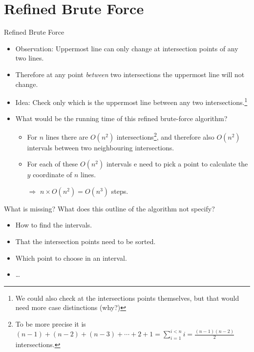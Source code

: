 \documentclass{article}
\begin{document}
\section{Refined Brute Force}
\begin{frame}{Refined Brute Force}

\begin{itemize}[<+->]
    \item Observation: Uppermost line can only change at intersection points of any two lines.
    \item Therefore at any point \emph{between} two intersections the uppermost line will not change.
    \item Idea: Check only which is the uppermost line between any two intersections.\footnote{We could also check at the intersections points themselves, but that would need more case distinctions (why?)}
    \item What would be the running time of this refined brute-force algorithm?
        \begin{itemize}
            \item For $n$ lines there are $O(n^2)$ intersections\footnote{To be more precise it is $ (n-1) + (n-2) + (n-3) + \cdots + 2 + 1 = \sum_{i = 1}^{i < n} i = \frac{(n-1)(n-2)}{2}$ intersections.}, and therefore also $O(n^2)$ intervals between two neighbouring intersections.
            \item For each of these $O(n^2)$ intervals e need to pick a point to calculate the $y$ coordinate of $n$ lines.
            \item[$\Rightarrow$] $n \times O(n^2) = O(n^3)$ steps.
        \end{itemize}
        \end{itemize}
\end{frame}

\begin{frame}{What is missing?}
    What does this outline of the algorithm not specify?
    \begin{itemize}
        \item How to find the intervals.
        \item That the intersection points need to be sorted.
        \item Which point to choose in an interval.
        \item \dots
    \end{itemize}
\end{frame}
\end{document}
